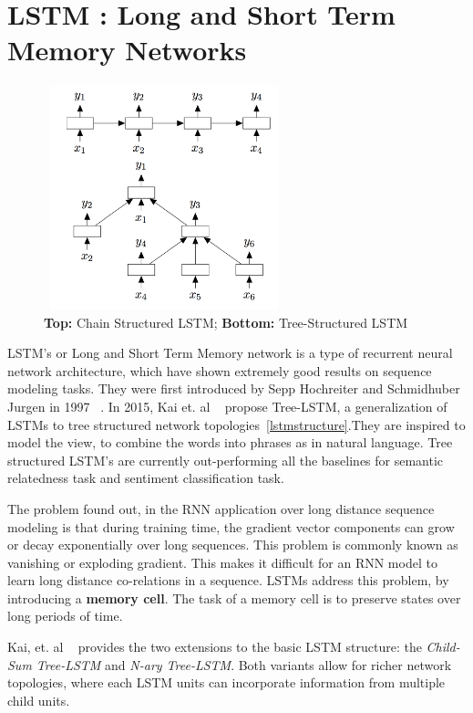 \section{LSTM : Long and Short Term Memory Networks}
\begin{figure}[ht!]
	\centering
		\includegraphics[height=65mm,  width=70mm]{figures/5_lstm1.png}
		\caption[LSTM Structures]{\textbf{Top:} Chain Structured LSTM;\textbf{ Bottom:} Tree-Structured LSTM}
			\label{lstmstructure}
\end{figure}

LSTM's or Long and Short Term Memory network is a type of recurrent neural network architecture, which have shown extremely good results on sequence modeling tasks. They were first introduced by Sepp Hochreiter and Schmidhuber Jurgen in 1997 ~\parencite{lstmoriginal}. In 2015, Kai et. al ~\parencite{lstmsentiment} propose Tree-LSTM, a generalization of LSTMs to tree structured network topologies~\autoref{lstmstructure}.They are inspired to model the view, to combine the words into phrases as in natural language. Tree structured LSTM's are currently out-performing all the baselines for semantic relatedness task and sentiment classification task.
\newline

The problem found out, in the RNN application over long distance sequence modeling is that during training time, the gradient vector components can grow or decay exponentially over long sequences. This problem is commonly known as vanishing or exploding gradient. This makes it difficult for an RNN model to learn long distance co-relations in a sequence.  LSTMs address this problem, by introducing a \textbf{memory cell}. The task of a memory cell is to preserve states over long periods of time. 

Kai, et. al ~\parencite{lstmsentiment}  provides the two extensions to the basic LSTM structure: the \textit{Child-Sum Tree-LSTM} and \textit{N-ary Tree-LSTM}. Both variants allow for richer network topologies, where each LSTM units can incorporate information from multiple child units.

